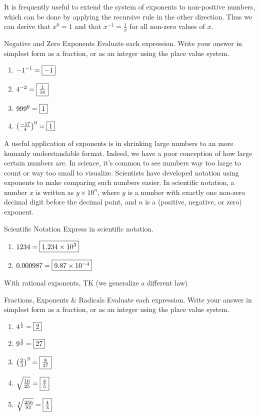\documentclass[a4paper,10pt]{report}
\begin{document}
It is frequently useful to extend the system of exponents to non-positive numbers, which can
be done by applying the recursive rule in the other direction. Thus we can derive that \(x^0
= 1\) and that \(x^{-1} = \frac{1}{x}\) for all non-zero values of \(x\).

\begin{problem}{Negative and Zero Exponents}
 Evaluate each expression. Write your answer in simplest form as a fraction, or
 as an integer using the place value system.

 \begin{enumerate}[\hspace{.5cm}a.]
  \item \({-1}^{-1}=\Ans{-1}\)
  \item \(4^{-2}=\Ans{\frac{1}{16}}\)
  \item \({999}^0=\Ans{1}\)
  \item \({\left(\frac{-17}{4}\right)}^0=\Ans{1}\)
 \end{enumerate}
\end{problem}

A useful application of exponents is in shrinking large numbers to an more humanly
understandable format. Indeed, we have a poor conception of how large certain numbers are.
In science, it's common to see numbers way too large to count or way too small to visualize.
Scientists have developed notation using exponents to make comparing such numbers easier. In
scientific notation, a number \(x\) is written as \(y\times 10^n\), where \(y\) is a number
with exactly one non-zero decimal digit before the decimal point, and \(n\) is a (positive,
negative, or zero) exponent.

\begin{problem}{Scientific Notation}
 Express in scientific notation.

 \begin{enumerate}[\hspace{.5cm}a.]
  \item \(1234=\Ans{1.234\times 10^3}\)
  \item \(0.000987= \Ans{9.87\times 10^{-4}}\)
 \end{enumerate}
\end{problem}

With rational exponents, TK (we generalize a different law)

\begin{problem}{Fractions, Exponents \& Radicals}
 Evaluate each expression. Write your answer in simplest form as a fraction, or
 as an integer using the place value system.

 \begin{enumerate}[\hspace{.5cm}a.]
  \item \(4^{\frac{1}{2}}=\Ans{2}\)
  \item \(9^{\frac{3}{2}}=\Ans{27}\)
  \item \({\left(\frac{2}{3}\right)}^3=\Ans{\frac{8}{27}}\)
  \item \(\sqrt{\frac{16}{25}}=\Ans{\frac{4}{5}}\)
  \item \(\sqrt[4]{\frac{256}{81}}=\Ans{\frac{4}{3}}\)
 \end{enumerate}
\end{problem}
\end{document}
